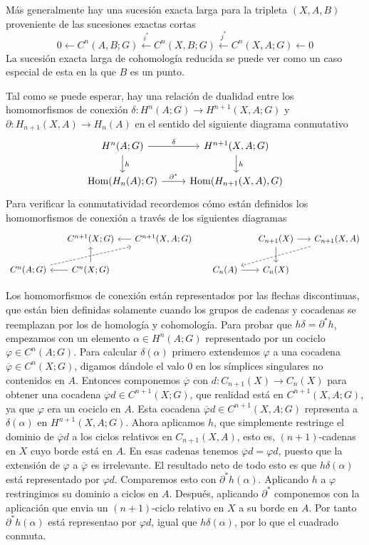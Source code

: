 \documentclass[TA.tex]{subfiles}
\begin{document}
Más generalmente hay una sucesión exacta larga para la tripleta $(X,A,B)$ proveniente de las sucesiones exactas cortas
\[0\leftarrow C^n(A,B;G)\xleftarrow{i^*}C^n(X,B;G)\xleftarrow{j^*} C^n(X,A;G)\leftarrow 0\]
La sucesión exacta larga de cohomología reducida se puede ver como un caso especial de esta en la que $B$ es un punto.

Tal como se puede esperar, hay una relación de dualidad entre los homomorfismos de conexión $\delta:H^n(A;G)\to H^{n+1}(X,A;G)$ y $\partial:H_{n+1}(X,A)\to H_n(A)$ en el sentido del siguiente diagrama conmutativo
\[
\begin{tikzcd}
H^n(A;G)\arrow[r, "\delta"]\arrow[d, "h"] & H^{n+1}(X,A;G)\arrow[d, "h"]\\
\Hom(H_n(A);G)\arrow[r, "\partial^*"] & \Hom(H_{n+1}(X,A),G)
\end{tikzcd}
\]
Para verificar la conmutatividad recordemos cómo están definidos los homomorfismos de conexión a través de los siguientes diagramas
\[
\begin{tikzcd}[column sep=15]
                           & C^{n+1}(X;G) & C^{n+1}(X,A;G)\arrow[l] & & C_{n+1}(X)\arrow[d]\arrow[r] & C_{n+1}(X,A)\arrow[dll, dashed]\\
C^n(A;G)\arrow[urr, dashed] & C^n(X;G)\arrow[l]\arrow[u] &           & C_n(A)\arrow[r] & C_n(X)
\end{tikzcd}
\]

Los homomorfismos de conexión están representados por las flechas discontinuas, que están bien definidas solamente cuando los grupos de cadenas y cocadenas se reemplazan por los de homología y cohomología. Para probar que $h\delta=\partial^*h$, empezamos con un elemento $\alpha\in H^n(A;G)$ representado por un cociclo $\varphi\in C^n(A;G)$. Para calcular $\delta(\alpha)$ primero extendemos $\varphi$ a una cocadena $\overline{\varphi}\in C^n(X;G)$, digamos dándole el valo 0 en los símplices singulares no contenidos en $A$. Entonces componemos $\overline{\varphi}$ con $d:C_{n+1}(X)\to C_n(X)$ para obtener una cocadena $\overline{\varphi}d\in C^{n+1}(X;G)$, que realidad está en $C^{n+1}(X,A;G)$, ya que $\varphi$ era un cociclo en $A$. Esta cocadena $\overline{\varphi}d\in C^{n+1}(X,A;G)$ representa a $\delta(\alpha)$ en $H^{n+1}(X,A;G)$. Ahora aplicamos $h$, que simplemente restringe el dominio de $\overline{\varphi}d$ a los ciclos relativos en $C_{n+1}(X,A)$, esto es, $(n+1)$-cadenas en $X$ cuyo borde está en $A$. En esas cadenas tenemos $\overline{\varphi}d=\varphi d$, puesto que la extensión de $\varphi$ a $\overline{\varphi}$ es irrelevante. El resultado neto de todo esto es que $h\delta(\alpha)$ está representado por $\varphi d$. Comparemos esto con $\partial^* h(\alpha)$. Aplicando $h$ a $\varphi$ restringimos su dominio a ciclos en $A$. Después, aplicando $\partial^*$ componemos con la aplicación que envia un $(n+1)$-ciclo relativo en $X$ a su borde en $A$. Por tanto $\partial^*h(\alpha)$ está representao por $\varphi d$, igual que $h\delta(\alpha)$, por lo que el cuadrado conmuta.
\end{document}

